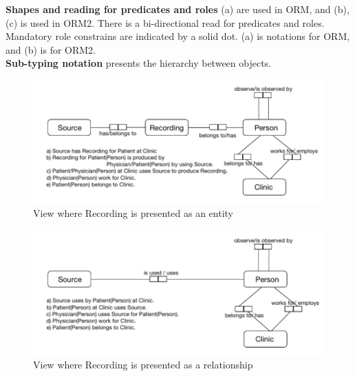 \textbf{Shapes and reading for predicates and roles} (a) are used in ORM, and (b), (c) is used in ORM2. There is a bi-directional read for predicates and roles.\\
Mandatory role constrains are indicated by a solid dot. (a) is notations for ORM, and (b) is for ORM2.\\
\textbf{Sub-typing notation} presents the hierarchy between objects.\\
\begin{figure}
    \centering
    \includegraphics[width=1.0\textwidth]{Figures/ConceptDB1.png}
    \caption{View where Recording is presented as an entity}
    \label{fig:Figures/ConceptDB1}
\end{figure}
\begin{figure}[ht]
    \centering
    \includegraphics[width=1.0\textwidth]{Figures/ConceptDB2.png}
    \caption{View where Recording is presented as a relationship}
    \label{fig:Figures/ConceptDB2}
\end{figure}

